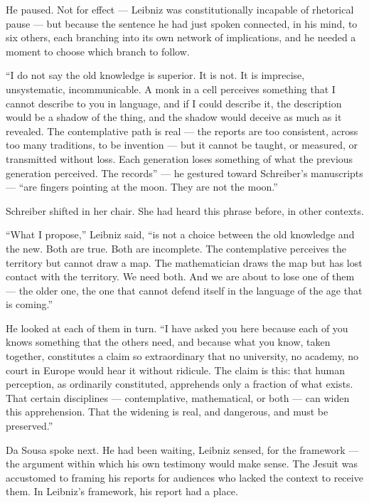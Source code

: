 He paused. Not for effect --- Leibniz was constitutionally incapable of rhetorical pause --- but because the sentence he had just spoken connected, in his mind, to six others, each branching into its own network of implications, and he needed a moment to choose which branch to follow.

``I do not say the old knowledge is superior. It is not. It is imprecise, unsystematic, incommunicable. A monk in a cell perceives something that I cannot describe to you in language, and if I could describe it, the description would be a shadow of the thing, and the shadow would deceive as much as it revealed. The contemplative path is real --- the reports are too consistent, across too many traditions, to be invention --- but it cannot be taught, or measured, or transmitted without loss. Each generation loses something of what the previous generation perceived. The records'' --- he gestured toward Schreiber's manuscripts --- ``are fingers pointing at the moon. They are not the moon.''

Schreiber shifted in her chair. She had heard this phrase before, in other contexts.

``What I propose,'' Leibniz said, ``is not a choice between the old knowledge and the new. Both are true. Both are incomplete. The contemplative perceives the territory but cannot draw a map. The mathematician draws the map but has lost contact with the territory. We need both. And we are about to lose one of them --- the older one, the one that cannot defend itself in the language of the age that is coming.''

He looked at each of them in turn. ``I have asked you here because each of you knows something that the others need, and because what you know, taken together, constitutes a claim so extraordinary that no university, no academy, no court in Europe would hear it without ridicule. The claim is this: that human perception, as ordinarily constituted, apprehends only a fraction of what exists. That certain disciplines --- contemplative, mathematical, or both --- can widen this apprehension. That the widening is real, and dangerous, and must be preserved.''

\scenebreak

Da Sousa spoke next. He had been waiting, Leibniz sensed, for the framework --- the argument within which his own testimony would make sense. The Jesuit was accustomed to framing his reports for audiences who lacked the context to receive them. In Leibniz's framework, his report had a place.

